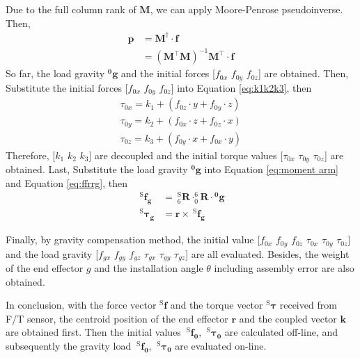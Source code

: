 Due to the full column rank of $\mathbf{M}$, we can apply Moore-Penrose pseudoinverse. Then, 
\begin{equation*}
\begin{split}
\boldsymbol{p} 	&= \mathbf{M}^{\dagger} \cdot \boldsymbol{f}\\
				&= \left( \mathbf{M}^\top\mathbf{M}\right) ^{-1}\mathbf{M}^\top \cdot \boldsymbol{f}
\end{split}
\end{equation*}
So far, the load gravity $\boldsymbol{^0\!g}$ and the initial forces [$f_{0x}$ $f_{0y}$ $f_{0z}$] are obtained. Then, Substitute the initial forces [$f_{0x}$ $f_{0y}$ $f_{0z}$] into Equation \ref{eq:k1k2k3}, then
\begin{equation}
\begin{split}
\tau _{0x}	=	k_1	+ \left( f_{0z} \cdot y + f_{0y} \cdot z \right) \\
\tau _{0y} 	=	k_2	+ \left( f_{0x} \cdot z + f_{0z} \cdot x \right) \\
\tau _{0z} 	=	k_3 + \left( f_{0y} \cdot x + f_{0x} \cdot y \right)
\end{split}
\end{equation}
Therefore, [$k_1$ $k_2$ $k_3$] are decoupled and the initial torque values [$\tau_{0x}$ $\tau_{0y}$ $\tau_{0z}$] are obtained. Last, Substitute the load gravity $\boldsymbol{^0\!g}$ into Equation \ref{eq:moment arm} and Equation \ref{eq:ffrrg}, then
\begin{equation}
\begin{split}
\ ^\mathrm{S}\!\boldsymbol{f_g} &= \ ^\mathrm{S}_6\mathbf{R} \cdot ^6_0\!\mathbf{R} \cdot \boldsymbol{^0\!g}	\\
\ ^\mathrm{S}\boldsymbol{\tau_g}	&= \boldsymbol{r} \times \ ^\mathrm{S}\!\boldsymbol{f_g} 
\end{split}
\end{equation}  
\par\noindent
Finally, by gravity compensation method, the initial value [$f_{0x}$ $f_{0y}$ $f_{0z}$ $\tau_{0x}$ $\tau_{0y}$ $\tau_{0z}$] and the load gravity [$f_{gx}$ $f_{gy}$ $f_{gz}$ $\tau_{gx}$ $\tau_{gy}$ $\tau_{gz}$] are all evaluated. Besides, the weight of the end effector $g$ and the installation angle $\theta$ including assembly error are also obtained.
\par
In conclusion, with the force vector $^\mathrm{S}\!\boldsymbol{f}$ and the torque vector $^\mathrm{S}\boldsymbol{\tau}$ received from F/T sensor, the centroid position of the end effector $\boldsymbol{r}$ and the coupled vector $\boldsymbol{k}$ are obtained first. Then the initial values $\ ^\mathrm{S}\!\boldsymbol{f_0}$, $\ ^\mathrm{S}\boldsymbol{\tau_0}$ are calculated off-line, and subsequently the gravity load $\ ^\mathrm{S}\!\boldsymbol{f_0}$, $\ ^\mathrm{S}\boldsymbol{\tau_0}$ are evaluated on-line.
